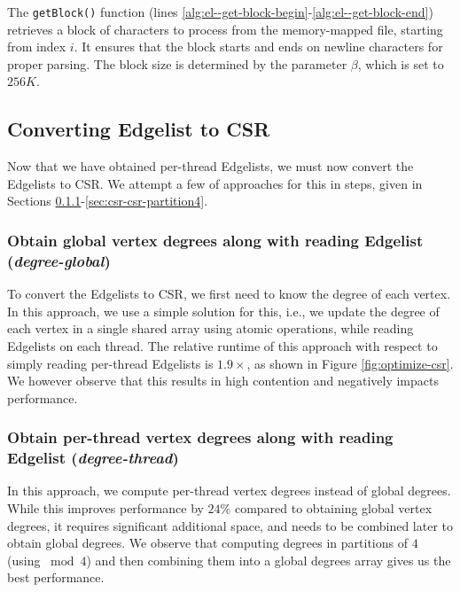 The \texttt{getBlock()} function (lines \ref{alg:el--get-block-begin}-\ref{alg:el--get-block-end}) retrieves a block of characters to process from the memory-mapped file, starting from index $i$. It ensures that the block starts and ends on newline characters for proper parsing. The block size is determined by the parameter $\beta$, which is set to $256K$.






\subsection{Converting Edgelist to CSR}

Now that we have obtained per-thread Edgelists, we must now convert the Edgelists to CSR. We attempt a few of approaches for this in steps, given in Sections \ref{sec:csr-degree-global}-\ref{sec:csr-csr-partition4}.


\subsubsection{Obtain global vertex degrees along with reading Edgelist (\textit{degree-global})}
\label{sec:csr-degree-global}

To convert the Edgelists to CSR, we first need to know the degree of each vertex. In this approach, we use a simple solution for this, i.e.,  we update the degree of each vertex in a single shared array using atomic operations, while reading Edgelists on each thread. The relative runtime of this approach with respect to simply reading per-thread Edgelists is $1.9\times$, as shown in Figure \ref{fig:optimize-csr}. We however observe that this results in high contention and negatively impacts performance.


\subsubsection{Obtain per-thread vertex degrees along with reading Edgelist (\textit{degree-thread})}
\label{sec:csr-degree-thread}

In this approach, we compute per-thread vertex degrees instead of global degrees. While this improves performance by $24\%$ compared to obtaining global vertex degrees, it requires significant additional space, and needs to be combined later to obtain global degrees. We observe that computing degrees in partitions of $4$ (using $\bmod 4$) and then combining them into a global degrees array gives us the best performance.


